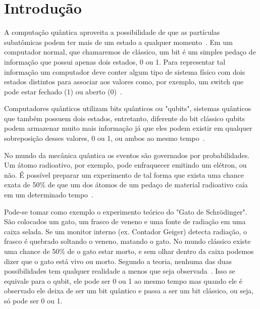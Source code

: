\documentclass[a4paper, 12pt, oneside]{book}
\begin{document}
\tableofcontents

\thispagestyle{myheadings}


\listoffigures
{}

\thispagestyle{myheadings}


\listoftables
{}

\thispagestyle{myheadings}


\pagebreak
{}

\chapter{Introdução}
\thispagestyle{empty}

A computação quântica aproveita a possibilidade de que as partículas subatômicas podem ter mais de um estado a qualquer momento~\cite{wiredQC}. Em um computador normal, que chamaremos de clássico, um bit é um simples pedaço de informação que possui apenas dois estados, 0 ou 1. Para representar tal informação um computador deve conter algum tipo de sistema físico com dois estados distintos para associar aos valores como, por exemplo, um switch que pode estar fechado (1) ou aberto (0)~\cite{mermin}.

Computadores quânticos utilizam bits quânticos ou "qubits", sistemas quânticos que também possuem dois estados, entretanto, diferente do bit clássico qubits podem armazenar muito mais informação já que eles podem existir em qualquer sobreposição desses valores, 0 ou 1, ou ambos ao mesmo tempo~\cite{wiredQC}. 

No mundo da mecânica quântica os eventos são governados por probabilidades. Um átomo radioativo, por exemplo, pode enfraquecer emitindo um elétron, ou não. É possível preparar um experimento de tal forma que exista uma chance exata de 50\% de que um dos átomos de um pedaço de material radioativo caía em um determinado tempo~\cite{gribbin}.

Pode-se tomar como exemplo o experimento teórico do "Gato de Schrödinger". São colocados um gato, um frasco de veneno e uma fonte de radiação em uma caixa selada. Se um monitor interno (ex. Contador Geiger) detecta radiação, o frasco é quebrado soltando o veneno, matando o gato. No mundo clássico existe uma chance de 50\% de o gato estar morto, e sem olhar dentro da caixa podemos dizer que o gato está vivo ou morto. Segundo a teoria, nenhuma das duas possibilidades tem qualquer realidade a menos que seja observada~\cite{gribbin}. Isso se equivale para o qubit, ele pode ser 0 ou 1 ao mesmo tempo mas quando ele é observado ele deixa de ser um bit quântico e passa a ser um bit clássico, ou seja, só pode ser 0 ou 1.
\end{document}
